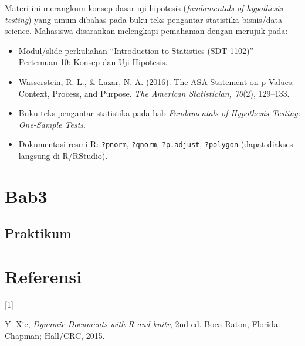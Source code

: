\documentclass[
  indonesian,
  letterpaper,
]{book}
\newlength{\cslhangindent}
\newlength{\csllabelwidth}
\newenvironment{CSLReferences}[2] %
 {\begin{list}{}{%
  \setlength{\itemindent}{0pt}
  \setlength{\leftmargin}{0pt}
  \setlength{\parsep}{0pt}
  \ifodd #1
   \setlength{\leftmargin}{\cslhangindent}
   \setlength{\itemindent}{-1\cslhangindent}
  \fi
  \setlength{\itemsep}{#2\baselineskip}}}
 {\end{list}}
\newcommand{\CSLLeftMargin}[1]{\parbox[t]{\csllabelwidth}{\strut#1\strut}}
\newcommand{\CSLRightInline}[1]{\parbox[t]{\linewidth - \csllabelwidth}{\strut#1\strut}}
\providecommand{\tightlist}{%
  \setlength{\itemsep}{0pt}\setlength{\parskip}{0pt}}
\begin{document}
Materi ini merangkum konsep dasar uji hipotesis (\emph{fundamentals of
hypothesis testing}) yang umum dibahas pada buku teks pengantar
statistika bisnis/data science. Mahasiswa disarankan melengkapi
pemahaman dengan merujuk pada:

\begin{itemize}
\tightlist
\item
  Modul/slide perkuliahan ``Introduction to Statistics (SDT-1102)'' --
  Pertemuan 10: Konsep dan Uji Hipotesis.
\item
  Wasserstein, R. L., \& Lazar, N. A. (2016). The ASA Statement on
  p-Values: Context, Process, and Purpose. \emph{The American
  Statistician, 70}(2), 129--133.
\item
  Buku teks pengantar statistika pada bab \emph{Fundamentals of
  Hypothesis Testing: One-Sample Tests}.
\item
  Dokumentasi resmi R: \texttt{?pnorm}, \texttt{?qnorm},
  \texttt{?p.adjust}, \texttt{?polygon} (dapat diakses langsung di
  R/RStudio).
\end{itemize}


\chapter{Bab3}\label{bab3}

\section{Praktikum}\label{praktikum}


\chapter*{Referensi}\label{referensi}


\protect{}\label{refs}
\begin{CSLReferences}{0}{0}
\CSLLeftMargin{{[}1{]} }%
\CSLRightInline{Y. Xie, \emph{\href{http://yihui.name/knitr/}{Dynamic
Documents with {R} and knitr}}, 2nd ed. Boca Raton, Florida: Chapman;
Hall/CRC, 2015.}

\end{CSLReferences}


\backmatter
\end{document}

